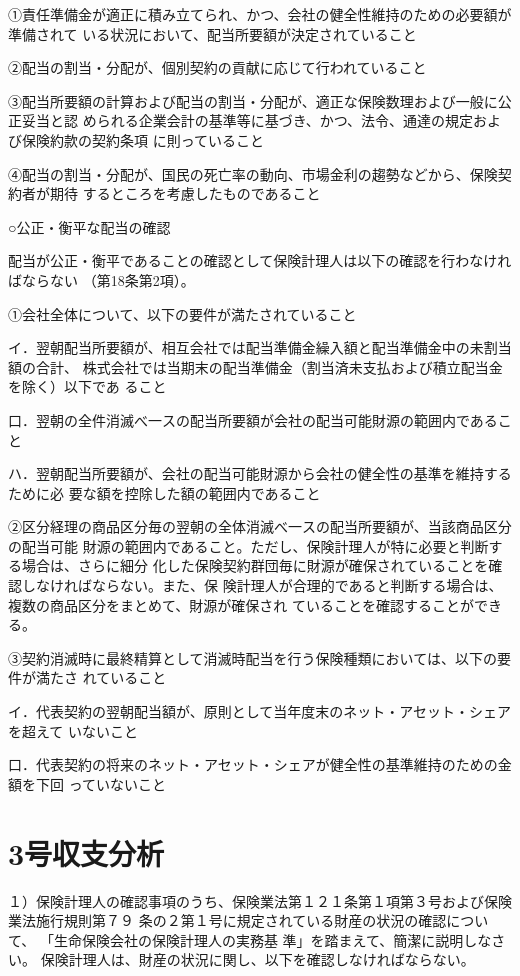 \documentclass[report,gutter=10mm,fore-edge=10mm,uplatex,dvipdfmx]{jlreq}
\begin{document}
①責任準備金が適正に積み立てられ、かつ、会社の健全性維持のための必要額が準備されて
いる状況において、配当所要額が決定されていること

②配当の割当・分配が、個別契約の貢献に応じて行われていること

③配当所要額の計算および配当の割当・分配が、適正な保険数理および一般に公正妥当と認
められる企業会計の基準等に基づき、かつ、法令、通達の規定および保険約款の契約条項
に則っていること

④配当の割当・分配が、国民の死亡率の動向、市場金利の趨勢などから、保険契約者が期待
するところを考慮したものであること

○公正・衡平な配当の確認

配当が公正・衡平であることの確認として保険計理人は以下の確認を行わなければならない
（第18条第2項）。

①会社全体について、以下の要件が満たされていること

イ．翌朝配当所要額が、相互会社では配当準備金繰入額と配当準備金中の未割当額の合計、
株式会社では当期末の配当準備金（割当済未支払および積立配当金を除く）以下であ
ること

口．翌朝の全件消滅べ一スの配当所要額が会社の配当可能財源の範囲内であること

ハ．翌朝配当所要額が、会社の配当可能財源から会社の健全性の基準を維持するために必
要な額を控除した額の範囲内であること

②区分経理の商品区分毎の翌朝の全体消滅べ一スの配当所要額が、当該商品区分の配当可能
財源の範囲内であること。ただし、保険計理人が特に必要と判断する場合は、さらに細分
化した保険契約群団毎に財源が確保されていることを確認しなければならない。また、保
険計理人が合理的であると判断する場合は、複数の商品区分をまとめて、財源が確保され
ていることを確認することができる。

③契約消滅時に最終精算として消滅時配当を行う保険種類においては、以下の要件が満たさ
れていること

イ．代表契約の翌朝配当額が、原則として当年度末のネット・アセット・シェアを超えて
いないこと

口．代表契約の将来のネット・アセット・シェアが健全性の基準維持のための金額を下回
っていないこと

\section{3号収支分析}

１）保険計理人の確認事項のうち、保険業法第１２１条第１項第３号および保険業法施行規則第７９
条の２第１号に規定されている財産の状況の確認について、
「生命保険会社の保険計理人の実務基
準」を踏まえて、簡潔に説明しなさい。
\answer{}
保険計理人は、財産の状況に関し、以下を確認しなければならない。
\end{document}
